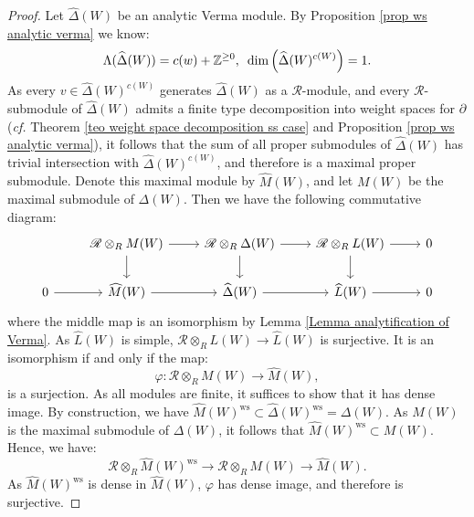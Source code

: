 \documentclass{amsart}
\begin{document}
\begin{proof}
Let  $\widehat{\Delta}(W)$ be an analytic Verma module. By Proposition \ref{prop ws analytic verma} we know:
\begin{equation*}
    \Lambda(\widehat{\Delta}(W))= c(w)+\mathbb{Z}^{\geq 0}, \textnormal{  } \operatorname{dim}\left(\widehat{\Delta}(W)^{c(W)}\right)=1.
\end{equation*}
As every $v\in \widehat{\Delta}(W)^{c(W)}$ generates $\widehat{\Delta}(W)$
as a $\mathscr{R}$-module, and every $\mathscr{R}$-submodule of  $\widehat{\Delta}(W)$ admits a finite type decomposition into weight spaces for $\partial$ (\emph{cf.} Theorem \ref{teo weight space decomposition ss case} and Proposition \ref{prop ws analytic verma}), it follows that the sum of all proper submodules of  $\widehat{\Delta}(W)$ has trivial intersection with $\widehat{\Delta}(W)^{c(W)}$, and therefore is a maximal proper submodule. Denote this maximal module by $\widehat{M}(W)$, and let $M(W)$ be the maximal submodule of $\Delta(W)$. Then we have the following commutative diagram:
\begin{equation*}
\begin{tikzcd}
            & \mathscr{R}\otimes_RM(W) \arrow[r] \arrow[d] & \mathscr{R}\otimes_R\Delta(W) \arrow[r] \arrow[d] & \mathscr{R}\otimes_RL(W) \arrow[r] \arrow[d] & 0 \\
0 \arrow[r] & \widehat{M}(W) \arrow[r]                     & \widehat{\Delta}(W) \arrow[r]                     & \widehat{L}(W) \arrow[r]                     & 0
\end{tikzcd}
\end{equation*}
where the middle map is an isomorphism by Lemma \ref{Lemma analytification of Verma}. As $\widehat{L}(W)$ is simple, $\mathscr{R}\otimes_RL(W)\rightarrow \widehat{L}(W)$ is surjective. It is an isomorphism if and only if the map:
\begin{equation*}
    \varphi:\mathscr{R}\otimes_{R}M(W)\rightarrow \widehat{M}(W),
\end{equation*}
is a surjection. As all modules are finite, it suffices to show that it has dense image. By construction, we have $\widehat{M}(W)^{\operatorname{ws}}\subset \widehat{\Delta}(W)^{\operatorname{ws}}= \Delta(W)$. As $M(W)$ is the maximal submodule of $\Delta(W)$, it follows that $\widehat{M}(W)^{\operatorname{ws}}\subset M(W)$. Hence, we have:
\begin{equation*}
    \mathscr{R}\otimes_{R}\widehat{M}(W)^{\operatorname{ws}}\rightarrow \mathscr{R}\otimes_{R}M(W)\rightarrow \widehat{M}(W).
\end{equation*}
As $\widehat{M}(W)^{\operatorname{ws}}$ is dense in $\widehat{M}(W)$, $\varphi$ has dense image, and therefore is surjective.
\end{proof}
\end{document}
